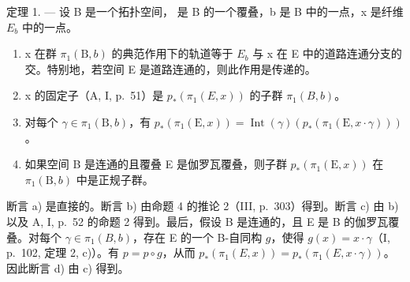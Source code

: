 定理 1. --- 设 B 是一个拓扑空间， 是 B 的一个覆叠，b 是 B 中的一点，x 是纤维 \(E_{b}\) 中的一点。

\begin{enumerate}
\def\labelenumi{\alph{enumi})}
\item
  x 在群 \(\pi_{1}(\mathrm{B},b)\) 的典范作用下的轨道等于 \(E_{b}\) 与 x 在 E 中的道路连通分支的交。特别地，若空间 E 是道路连通的，则此作用是传递的。
\item
  x 的固定子（A, I, p.~51）是 \(p_{*}(\pi_{1}(E,x))\) 的子群 \(\pi_{1}(B,b)\)。
\item
  对每个 \(\gamma \in \pi_1(\mathrm{B},b)\)，有 \(p_*(\pi_1(\mathrm{E},x)) = \operatorname{Int}(\gamma)(p_*(\pi_1(\mathrm{E},x \cdot \gamma)))\)。
\item
  如果空间 B 是连通的且覆叠 E 是伽罗瓦覆叠，则子群 \(p_{*}(\pi_{1}(\mathrm{E},x))\) 在 \(\pi_{1}(\mathrm{B},b)\) 中是正规子群。
\end{enumerate}

断言 a) 是直接的。断言 b) 由命题 4 的推论 2（III, p.~303）得到。断言 c) 由 b) 以及 A, I, p.~52 的命题 2 得到。最后，假设 B 是连通的，且 E 是 B 的伽罗瓦覆叠。对每个 \(\gamma \in \pi_1(B,b)\)，存在 E 的一个 B-自同构 \(g\)，使得 \(g(x) = x \cdot \gamma\)（I, p.~102, 定理 2, c)）。有 \(p = p \circ g\)，从而 \(p_*(\pi_1(E,x)) = p_*(\pi_1(E,x \cdot \gamma))\)。因此断言 d) 由 c) 得到。
